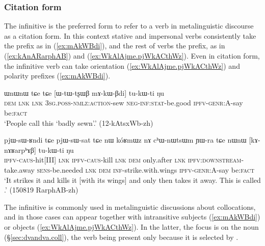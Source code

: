 \subsubsection{Citation form} \label{sec:inf.citation}
The infinitive is the preferred form to refer to a verb in metalinguistic discourse as a citation form. In this context stative and impersonal verbs consistently take the  prefix as in (\ref{ex:mAkWBdi}), and the rest of verbs the  prefix, as in (\ref{ex:kAnARarphAB}) and (\ref{ex:WkAlAjme.pjWkACthWz}). Even in citation form, the infinitive verb can take orientation (\ref{ex:WkAlAjme.pjWkACthWz}) and polarity prefixes (\ref{ex:mAkWBdi}).  

\begin{exe}
\ex  \label{ex:mAkWBdi}
 \gll ɯnɯnɯ tɕe tɕe [ɯ-tɯ-tʂɯβ mɤ-kɯ-βdi] tu-kɯ-ti ŋu \\ 
 \textsc{dem} \textsc{lnk} \textsc{lnk} \textsc{3sg}.\textsc{poss}-\textsc{nmlz}:\textsc{action}-sew \textsc{neg}-\textsc{inf}:\textsc{stat}-be.good  \textsc{ipfv}-\textsc{genr}:A-say be:\textsc{fact}  \\
\glt `People call this `badly sewn'.'  (12-kAtsxWb-zh)
\end{exe}

\begin{exe}
\ex \label{ex:kAnARarphAB}
 \gll  pjɯ-sɯ-ʁndi tɕe pjɯ-sɯ-sat tɕe nɯ kóʁmɯz nɤ cʰɯ-nɯtsɯm ɲɯ-ra tɕe nɯnɯ [kɤ-nɤʁarpʰɤβ] tu-kɯ-ti ŋu  \\
 \textsc{ipfv}-\textsc{caus}-hit[III]  \textsc{lnk} \textsc{ipfv}-\textsc{caus}-kill \textsc{lnk} \textsc{dem} only.after \textsc{lnk} \textsc{ipfv}:\textsc{downstream}-take.away \textsc{sens}-be.needed \textsc{lnk} \textsc{dem} \textsc{inf}-strike.with.wings \textsc{ipfv}-\textsc{genr}:A-say be:\textsc{fact}  \\
 \glt `It strikes it and kills it [with its wings] and only then takes it away. This is called .' (150819 RarphAB-zh)
\end{exe}


The infinitive is commonly used in metalinguistic discussions about collocations, and in those cases can appear together with intransitive subjects (\ref{ex:mAkWBdi}) or objects (\ref{ex:WkAlAjme.pjWkACthWz}). In the latter, the focus is on the noun  (§\ref{sec:dvandva.coll}), the verb  being present only because it is selected by .

